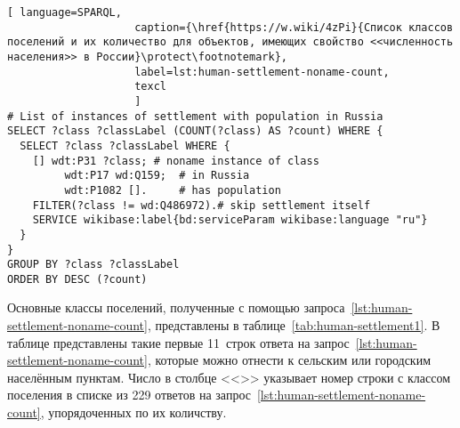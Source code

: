 \begin{lstlisting}[ language=SPARQL, 
                    caption={\href{https://w.wiki/4zPi}{Список классов поселений и их количество для объектов, имеющих свойство <<численность населения>> в России}\protect\footnotemark},
                    label=lst:human-settlement-noname-count,
                    texcl 
                    ]
# List of instances of settlement with population in Russia
SELECT ?class ?classLabel (COUNT(?class) AS ?count) WHERE {
  SELECT ?class ?classLabel WHERE {
    [] wdt:P31 ?class; # noname instance of class
         wdt:P17 wd:Q159;  # in Russia
         wdt:P1082 [].     # has population
    FILTER(?class != wd:Q486972).# skip settlement itself
    SERVICE wikibase:label{bd:serviceParam wikibase:language "ru"}
  }
}
GROUP BY ?class ?classLabel
ORDER BY DESC (?count)
\end{lstlisting}%

Основные классы поселений, полученные с помощью запроса~\ref{lst:human-settlement-noname-count}, 
представлены в таблице~\ref{tab:human-settlement1}. 
В таблице представлены такие первые 11~строк ответа на запрос~\protect\ref{lst:human-settlement-noname-count}, 
    которые можно отнести к сельским или городским населённым пунктам. 
    Число в столбце <<\textnumero>> указывает номер строки с классом поселения 
    в списке из 229 ответов на запрос~\ref{lst:human-settlement-noname-count}, 
    упорядоченных по их количству.



